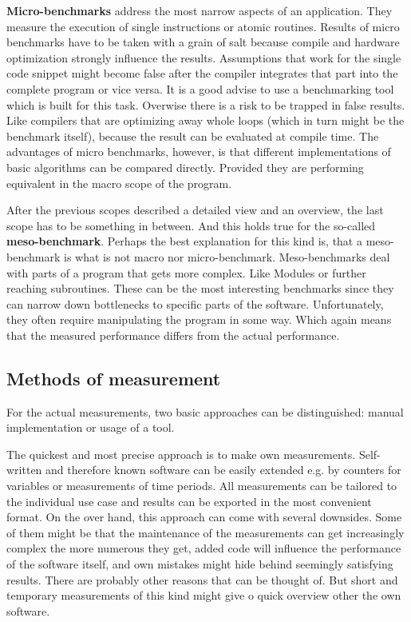 \textbf{Micro-benchmarks} address the most narrow aspects of an application. They measure the execution of single instructions or atomic routines. Results of micro benchmarks have to be taken with a grain of salt because compile and hardware optimization strongly influence the results. Assumptions that work for the single code snippet might become false after the compiler integrates that part into the complete program or vice versa. It is a good advise to use a benchmarking tool which is built for this task. Overwise there is a risk to be trapped in false results. Like compilers that are optimizing away whole loops (which in turn might be the benchmark itself), because the result can be evaluated at compile time. The advantages of micro benchmarks, however, is that different implementations of basic algorithms can be compared directly. Provided they are performing equivalent in the macro scope of the program.

After the previous scopes described a detailed view and an overview, the last scope has to be something in between. And this holds true for the so-called \textbf{meso-benchmark}. Perhaps the best explanation for this kind is, that a meso-benchmark is what is not macro nor micro-benchmark. Meso-benchmarks deal with parts of a program that gets more complex. Like Modules or further reaching subroutines. These can be the most interesting benchmarks since they can narrow down bottlenecks to specific parts of the software. Unfortunately, they often require manipulating the program in some way. Which again means that the measured performance differs from the actual performance.


\subsection{Methods of measurement}
\label{BenchMethods}
For the actual measurements, two basic approaches can be distinguished: manual implementation or usage of a tool.

The quickest and most precise approach is to make own measurements. Self-written and therefore known software can be easily extended e.g. by counters for variables or measurements of time periods. All measurements can be tailored to the individual use case and results can be exported in the most convenient format. On the over hand, this approach can come with several downsides. Some of them might be that the maintenance of the measurements can get increasingly complex the more numerous they get, added code will influence the performance of the software itself, and own mistakes might hide behind seemingly satisfying results. There are probably other reasons that can be thought of. But short and temporary measurements of this kind might give o quick overview other the own software.


